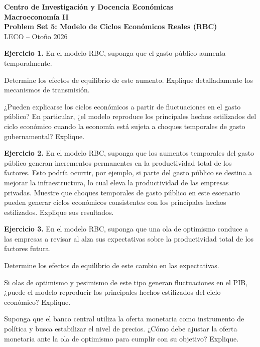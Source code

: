 \documentclass[11pt]{article}
\let\enumerateoriginal\enumerate
\let\endenumerateoriginal\endenumerate
\renewenvironment{enumerate}{%
  \enumerateoriginal
  \setlength{\itemsep}{0.5em}%
  \setlength{\parsep}{0pt}%
  \setlength{\topsep}{0.4em}%
}{\endenumerateoriginal}
\begin{document}
\begin{center}
  {\large\textbf{Centro de Investigación y Docencia Económicas}}\\[0.25em]
  {\large\textbf{Macroeconomía II}}\\[0.2em]
  {\large\textbf{Problem Set 5: Modelo de Ciclos Económicos Reales (RBC)}}\\[0.35em]
  LECO -- Otoño 2026
\end{center}

\vspace{0.6em}

\textbf{Ejercicio 1.} En el modelo RBC, suponga que el gasto público aumenta temporalmente.  
\begin{enumerate}
    \item Determine los efectos de equilibrio de este aumento. Explique detalladamente los mecanismos de transmisión.
    \item ¿Pueden explicarse los ciclos económicos a partir de fluctuaciones en el gasto público? En particular, ¿el modelo reproduce los principales hechos estilizados del ciclo económico cuando la economía está sujeta a choques temporales de gasto gubernamental? Explique.
\end{enumerate}


\vspace{0.5em}

\textbf{Ejercicio 2.} En el modelo RBC, suponga que los aumentos temporales del gasto público generan incrementos permanentes en la productividad total de los factores. Esto podría ocurrir, por ejemplo, si parte del gasto público se destina a mejorar la infraestructura, lo cual eleva la productividad de las empresas privadas. Muestre que choques temporales de gasto público en este escenario pueden generar ciclos económicos consistentes con los principales hechos estilizados. Explique sus resultados.

\vspace{0.5em}


\textbf{Ejercicio 3.} En el modelo RBC, suponga que una ola de optimismo conduce a las empresas a revisar al alza sus expectativas sobre la productividad total de los factores futura.
\begin{enumerate}
    \item Determine los efectos de equilibrio de este cambio en las expectativas.

    \item Si olas de optimismo y pesimismo de este tipo generan fluctuaciones en el PIB, ¿puede el modelo reproducir los principales hechos estilizados del ciclo económico? Explique.

    \item Suponga que el banco central utiliza la oferta monetaria como instrumento de política y busca estabilizar el nivel de precios. ¿Cómo debe ajustar la oferta monetaria ante la ola de optimismo para cumplir con su objetivo? Explique.
\end{enumerate}
\end{document}
